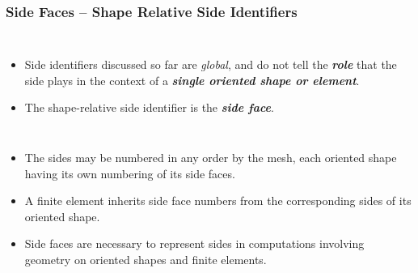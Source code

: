 \documentclass[compress]{beamer}
\begin{document}
\begin{frame}
  \frametitle{Side Faces -- Shape Relative Side Identifiers}
  \begin{columns}
      \begin{itemize}[<+->]
        \item Side identifiers discussed so far are \emph{global}, and do not tell the \emph{\textbf{role}} that the side plays
          in the context of a \emph{\textbf{single oriented shape or element}}.
        \item The shape-relative side identifier is the \emph{\textbf{side face}}.
      \end{itemize}
       {}
               {}
  \end{columns}
  \begin{itemize}[<+->]
    \item The sides may be numbered in any order by the mesh, each oriented shape having its own numbering of its side faces.
    \item A finite element inherits side face numbers from the corresponding sides of its oriented shape.
    \item Side faces are necessary to represent sides in computations involving geometry on oriented shapes and finite elements.
  \end{itemize}
\end{frame}
 
\end{document}
